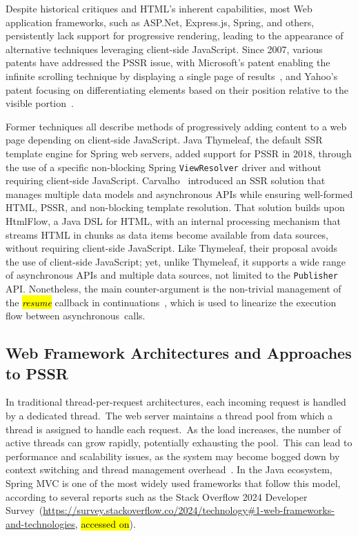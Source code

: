 \documentclass[software,article,accept,pdftex,moreauthors]{Definitions/mdpi}
\begin{document}
Despite historical critiques and HTML's inherent capabilities, most Web
application frameworks, such as ASP.Net, Express.js, Spring, and others,
persistently lack support for progressive rendering, leading to the appearance
of alternative techniques leveraging client-side JavaScript. Since 2007,
various patents have addressed the PSSR issue, with Microsoft's patent enabling
the infinite scrolling technique by displaying a single page of
results~\cite{scroll2007}, and Yahoo's patent focusing on differentiating
elements based on their position relative to the visible
portion~\cite{schiller2007progressive}.

Former techniques all describe methods of progressively adding content to a web
page depending on client-side JavaScript.
Java Thymeleaf, the default SSR template engine for Spring web servers,
added support for PSSR in 2018, through the use of a specific non-blocking
Spring \texttt{ViewResolver} driver and without requiring client-side
JavaScript.
Carvalho~\cite{carvalho2023async} introduced an SSR solution that manages
multiple data models and asynchronous APIs while ensuring well-formed HTML,
PSSR, and non-blocking template resolution. That solution builds upon HtmlFlow,
a Java DSL for HTML, with an internal processing mechanism that streams HTML in
chunks as data items become available from data sources, without requiring
client-side JavaScript. Like Thymeleaf, their proposal avoids the use of
client-side JavaScript; yet, unlike Thymeleaf, it supports a wide range of
asynchronous APIs and multiple data sources, not limited to the
\texttt{Publisher} API. Nonetheless, the main counter-argument is the non-trivial
management of the \emph{\hl{resume}} callback in
continuations~\cite{von2003events,callbackhell}, which is used to linearize the
execution flow between asynchronous~calls.

\subsection{Web Framework Architectures and Approaches to PSSR}
\label{sec:web-frameworks}

In traditional thread-per-request architectures, each incoming request is
handled by a dedicated thread.~The web server maintains a thread pool from
which a thread is assigned to handle each request.~As the load increases, the
number of active threads can grow rapidly, potentially exhausting the pool.~This can lead to performance and scalability issues, as the system may become
bogged down by context switching and thread management
overhead~\cite{kant2000scalable}. In the Java ecosystem, Spring MVC is one of
the most widely used frameworks that follow this model, according to several
reports such as the Stack Overflow 2024 Developer
Survey~({\url{https://survey.stackoverflow.co/2024/technology\#1-web-frameworks-and-technologies}}, \hl{accessed on}).
\end{document}
